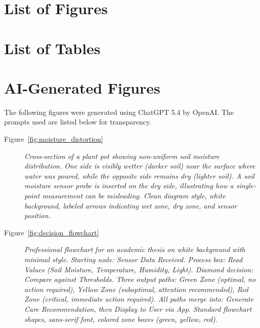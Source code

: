 \documentclass[a4paper, 12pt, twoside, openright]{report}
\begin{document}
  {
    \makeatletter
	\section*{List of Figures}

	\section*{List of Tables}


	\section*{AI-Generated Figures}
	The following figures were generated using ChatGPT 5.4 by OpenAI. The prompts used are listed below for transparency.

	\begin{small}
	\begin{description}
		\item[Figure~\ref{fig:moisture_distortion}] \textit{Cross-section of a plant pot showing non-uniform soil moisture distribution. One side is visibly wetter (darker soil) near the surface where water was poured, while the opposite side remains dry (lighter soil). A soil moisture sensor probe is inserted on the dry side, illustrating how a single-point measurement can be misleading. Clean diagram style, white background, labeled arrows indicating wet zone, dry zone, and sensor position.}

		\item[Figure~\ref{fig:decision_flowchart}] \textit{Professional flowchart for an academic thesis on white background with minimal style. Starting node: Sensor Data Received. Process box: Read Values (Soil Moisture, Temperature, Humidity, Light). Diamond decision: Compare against Thresholds. Three output paths: Green Zone (optimal, no action required), Yellow Zone (suboptimal, attention recommended), Red Zone (critical, immediate action required). All paths merge into: Generate Care Recommendation, then Display to User via App. Standard flowchart shapes, sans-serif font, colored zone boxes (green, yellow, red).}
	\end{description}
	\end{small}
    \makeatother
  }


	\clearpage
	
	\begingroup
	\sloppy
	
	
	\endgroup
	

 
\end{document}
